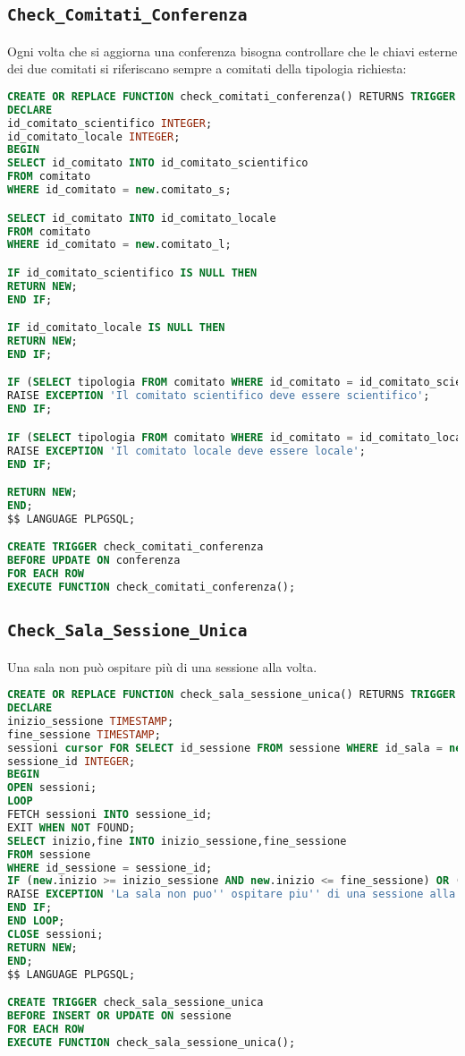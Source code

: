 \subsection{\texttt{Check\_Comitati\_Conferenza}}
Ogni volta che si aggiorna una conferenza bisogna controllare che le chiavi esterne dei due comitati si riferiscano sempre a comitati della tipologia richiesta:
\begin{lstlisting}[language=SQL, caption={\texttt{check\_comitati\_conferenza}},style=mystyle]
CREATE OR REPLACE FUNCTION check_comitati_conferenza() RETURNS TRIGGER AS $$
DECLARE 
id_comitato_scientifico INTEGER;
id_comitato_locale INTEGER;
BEGIN
SELECT id_comitato INTO id_comitato_scientifico
FROM comitato
WHERE id_comitato = new.comitato_s;

SELECT id_comitato INTO id_comitato_locale
FROM comitato
WHERE id_comitato = new.comitato_l;

IF id_comitato_scientifico IS NULL THEN
RETURN NEW;
END IF;

IF id_comitato_locale IS NULL THEN
RETURN NEW;
END IF;

IF (SELECT tipologia FROM comitato WHERE id_comitato = id_comitato_scientifico) <> 'scientifico' THEN
RAISE EXCEPTION 'Il comitato scientifico deve essere scientifico';
END IF;

IF (SELECT tipologia FROM comitato WHERE id_comitato = id_comitato_locale) <> 'locale' THEN
RAISE EXCEPTION 'Il comitato locale deve essere locale';
END IF;

RETURN NEW;
END;
$$ LANGUAGE PLPGSQL;

CREATE TRIGGER check_comitati_conferenza
BEFORE UPDATE ON conferenza
FOR EACH ROW
EXECUTE FUNCTION check_comitati_conferenza();
\end{lstlisting}
\subsection{\texttt{Check\_Sala\_Sessione\_Unica}}
Una sala non può ospitare più di una sessione alla volta.
\begin{lstlisting}[caption={\texttt{Check\_sala\_sessione\_unica}}, language=SQL, style=mystyle]
CREATE OR REPLACE FUNCTION check_sala_sessione_unica() RETURNS TRIGGER AS $$
DECLARE
inizio_sessione TIMESTAMP;
fine_sessione TIMESTAMP;
sessioni cursor FOR SELECT id_sessione FROM sessione WHERE id_sala = new.id_sala;
sessione_id INTEGER;
BEGIN
OPEN sessioni;
LOOP
FETCH sessioni INTO sessione_id;
EXIT WHEN NOT FOUND;
SELECT inizio,fine INTO inizio_sessione,fine_sessione
FROM sessione
WHERE id_sessione = sessione_id;
IF (new.inizio >= inizio_sessione AND new.inizio <= fine_sessione) OR (new.fine >= inizio_sessione AND new.fine <= fine_sessione) THEN
RAISE EXCEPTION 'La sala non puo'' ospitare piu'' di una sessione alla volta';
END IF;
END LOOP;
CLOSE sessioni;
RETURN NEW;
END;
$$ LANGUAGE PLPGSQL;

CREATE TRIGGER check_sala_sessione_unica
BEFORE INSERT OR UPDATE ON sessione
FOR EACH ROW
EXECUTE FUNCTION check_sala_sessione_unica();
\end{lstlisting}
